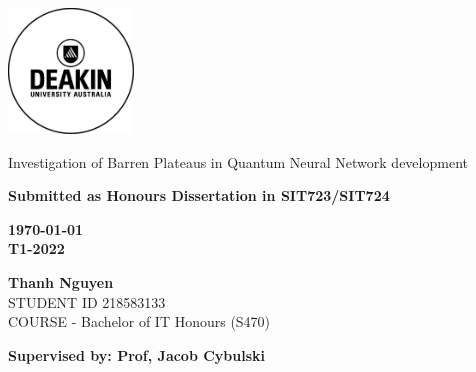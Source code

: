 \thispagestyle{empty}
\begin{titlepage}
    \includegraphics[width=0.25\textwidth]{src/CoverPage/Deakin_Logo.jpeg}
        \begin{center}
        \vspace*{4cm}
        {\LARGE Investigation of Barren Plateaus in Quantum Neural Network development} %
        \vspace{3cm}
            \begin{large}   
    
        
            \bf Submitted as Honours Dissertation in SIT723/SIT724
            \vspace{1cm}
        
            \bf \today \\
            T1-2022        
        
            \vspace{3cm}
            \textbf{Thanh Nguyen}\\
            STUDENT ID 218583133 \\
            COURSE - Bachelor of IT Honours (S470)
            \vfill

            \bf \normalsize Supervised by: Prof, Jacob Cybulski\\
       
        \end{large}  
   \end{center}
\end{titlepage}
